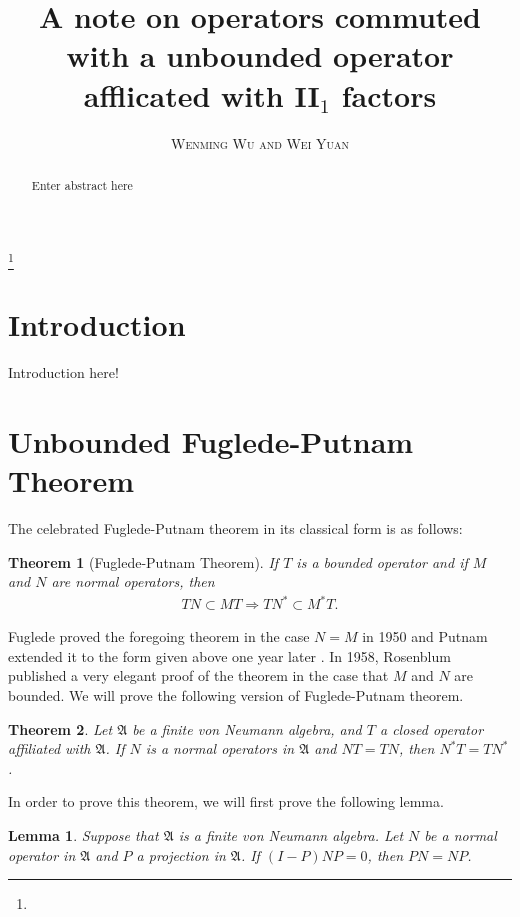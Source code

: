 \documentclass[a4paper,10pt]{amsart}
\newtheorem{theorem}{Theorem}[section]
\newtheorem{lemma}{Lemma}[section]
\newcommand{\AAA}{\mathfrak A}
\newcommand{\titleinfo}{A note on operators commuted with a 
    unbounded operator afflicated with II$_1$ factors}
\newcommand{\authorinfo}{Wenming Wu and Wei Yuan}
\begin{document}
\title{\LARGE\textbf{\titleinfo}} 
\author{\large\textsc{\authorinfo}} 
\address{AMSS}  
\email{}

\date{}

\begin{abstract}
Enter abstract here
\end{abstract}

\thanks{}
\maketitle


\section*{Introduction}
Introduction here!

\section{Unbounded Fuglede-Putnam Theorem}
The celebrated Fuglede-Putnam theorem in its classical form is as follows:
\begin{theorem}[Fuglede-Putnam Theorem] \label{fthm0}
   If $T$ is a bounded operator and if $M$ and $N$ are normal operators, then
   \begin{align*}
       TN \subset MT \Rightarrow TN^{*} \subset M^{*}T.
   \end{align*}
\end{theorem}

Fuglede \cite{F} proved the foregoing theorem in the case $N=M$ in 1950 and Putnam 
extended it to the form given above one year later \cite{CRP}. In 1958, Rosenblum
published a very elegant proof of the theorem in the case that $M$ and $N$ are
bounded. We will prove the following version of Fuglede-Putnam theorem.

\begin{theorem}\label{fthm1}
    Let $\AAA$ be a finite von Neumann algebra,
    and $T$ a closed operator affiliated with $\AAA$. 
    If $N$ is a normal operators in $\AAA$ and $NT = TN$, then
    $N^{*}T = TN^{*}$.
\end{theorem}

In order to prove this theorem, we will first prove the following lemma.
\begin{lemma} \label{flam1}
   Suppose that $\AAA$ is a finite von Neumann algebra. 
   Let $N$ be a normal operator in $\AAA$ and $P$ a projection in $\AAA$.
   If $(I-P)NP = 0$, then $PN = NP$.
\end{lemma}
\end{document}
